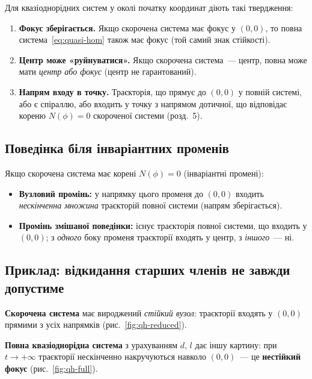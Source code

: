 \documentclass[12pt,a4paper]{article}
\theoremstyle{definition}
\theoremstyle{plain}
\begin{document}
Для квазіоднорідних систем у околі початку координат діють такі твердження:

\begin{enumerate}[leftmargin=1.8em]
  \item \textbf{Фокус зберігається.} Якщо скорочена система має фокус у
        $(0,0)$, то повна система~\eqref{eq:quasi-hom} також має фокус
        (той самий знак стійкості).
  \item \textbf{Центр може «руйнуватися».} Якщо скорочена система~--- центр,
        повна може мати \emph{центр або фокус} (центр не гарантований).
  \item \textbf{Напрям входу в точку.} Траєкторія, що прямує до $(0,0)$ у
        повній системі, або є спіраллю, або входить у точку з напрямом
        дотичної, що відповідає кореню $N(\phi)=0$ скороченої системи
        (розд.~5).
\end{enumerate}

\subsection{Поведінка біля інваріантних променів}

Якщо скорочена система має корені $N(\phi)=0$ (інваріантні промені):

\begin{itemize}[leftmargin=1.4em]
  \item \textbf{Вузловий промінь:} у напрямку цього променя до $(0,0)$
        входить \emph{нескінченна множина} траєкторій повної системи
        (напрям зберігається).
  \item \textbf{Промінь змішаної поведінки:} існує траєкторія повної системи,
        що входить у $(0,0)$; з \emph{одного} боку променя траєкторії
        входять у центр, з \emph{іншого}~--- ні.
\end{itemize}

\subsection{Приклад: відкидання старших членів не завжди допустиме}

\textbf{Скорочена система} має вироджений \emph{стійкий вузол}: траєкторії
входять у $(0,0)$ прямими з усіх напрямків (рис.~\ref{fig:qh-reduced}).

\textbf{Повна квазіоднорідна система} з урахуванням $d$, $l$ дає іншу
картину: при $t\to+\infty$ траєкторії нескінченно накручуються навколо
$(0,0)$~--- це \textbf{нестійкий фокус} (рис.~\ref{fig:qh-full}).
\end{document}
